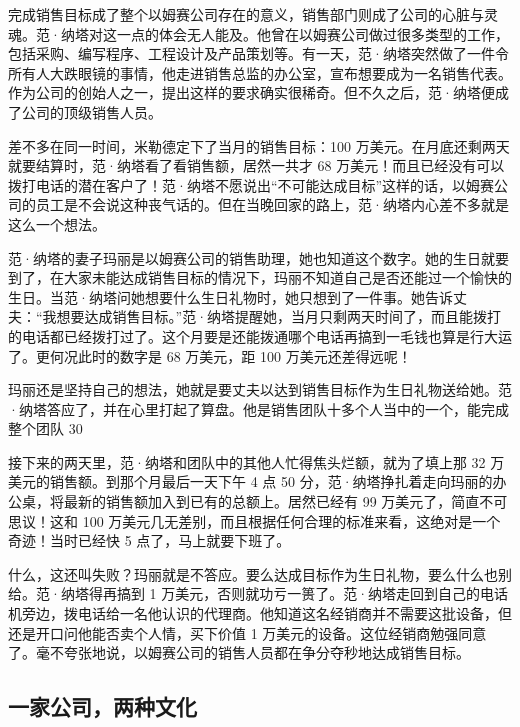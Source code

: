 \documentclass[12pt,UTF8]{ctexbook}
\begin{document}
完成销售目标成了整个以姆赛公司存在的意义，销售部门则成了公司的心脏与灵魂。范·纳塔对这一点的体会无人能及。他曾在以姆赛公司做过很多类型的工作，包括采购、编写程序、工程设计及产品策划等。有一天，范·纳塔突然做了一件令所有人大跌眼镜的事情，他走进销售总监的办公室，宣布想要成为一名销售代表。作为公司的创始人之一，提出这样的要求确实很稀奇。但不久之后，范·纳塔便成了公司的顶级销售人员。

差不多在同一时间，米勒德定下了当月的销售目标：100 万美元。在月底还剩两天就要结算时，范·纳塔看了看销售额，居然一共才 68 万美元！而且已经没有可以拨打电话的潜在客户了！范·纳塔不愿说出“不可能达成目标”这样的话，以姆赛公司的员工是不会说这种丧气话的。但在当晚回家的路上，范·纳塔内心差不多就是这么一个想法。

范·纳塔的妻子玛丽是以姆赛公司的销售助理，她也知道这个数字。她的生日就要到了，在大家未能达成销售目标的情况下，玛丽不知道自己是否还能过一个愉快的生日。当范·纳塔问她想要什么生日礼物时，她只想到了一件事。她告诉丈夫：“我想要达成销售目标。”范·纳塔提醒她，当月只剩两天时间了，而且能拨打的电话都已经拨打过了。这个月要是还能拨通哪个电话再搞到一毛钱也算是行大运了。更何况此时的数字是 68 万美元，距 100 万美元还差得远呢！

玛丽还是坚持自己的想法，她就是要丈夫以达到销售目标作为生日礼物送给她。范·纳塔答应了，并在心里打起了算盘。他是销售团队十多个人当中的一个，能完成整个团队 30%

接下来的两天里，范·纳塔和团队中的其他人忙得焦头烂额，就为了填上那 32 万美元的销售额。到那个月最后一天下午 4 点 50 分，范·纳塔挣扎着走向玛丽的办公桌，将最新的销售额加入到已有的总额上。居然已经有 99 万美元了，简直不可思议！这和 100 万美元几无差别，而且根据任何合理的标准来看，这绝对是一个奇迹！当时已经快 5 点了，马上就要下班了。

什么，这还叫失败？玛丽就是不答应。要么达成目标作为生日礼物，要么什么也别给。范·纳塔得再搞到 1 万美元，否则就功亏一篑了。范·纳塔走回到自己的电话机旁边，拨电话给一名他认识的代理商。他知道这名经销商并不需要这批设备，但还是开口问他能否卖个人情，买下价值 1 万美元的设备。这位经销商勉强同意了。毫不夸张地说，以姆赛公司的销售人员都在争分夺秒地达成销售目标。





\subsection{一家公司，两种文化}
\end{document}
